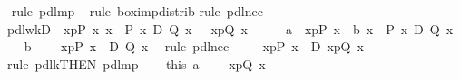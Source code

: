 \begin{isabellebody}
\ \isamarkupfalse%
rule\ pdl{\isacharunderscore}mp{\isacharparenright}\isanewline
\ \isamarkupfalse%
rule\ box{\isacharunderscore}imp{\isacharunderscore}distrib{\isacharparenright}\isanewline
\isamarkupfalse%
rule\ pdl{\isacharunderscore}nec{\isacharparenright}\isanewline
\isanewline
\isanewline
\isamarkupfalse%
\ pdl{\isacharunderscore}wkD{\isacharcolon}\ {\isachardoublequote}{\isasymlbrakk}{\isasymturnstile}\ {\isasymlangle}x{\isasymleftarrow}p{\isasymrangle}{\isacharparenleft}P\ x{\isacharparenright}{\isacharsemicolon}\ {\isasymforall}x{\isachardot}\ {\isasymturnstile}\ P\ x\ {\isasymlongrightarrow}\isactrlsub D\ Q\ x{\isasymrbrakk}\ {\isasymLongrightarrow}\ {\isasymturnstile}\ {\isasymlangle}x{\isasymleftarrow}p{\isasymrangle}{\isacharparenleft}Q\ x{\isacharparenright}{\isachardoublequote}\isanewline
\isamarkupfalse%
\ {\isacharminus}\isanewline
\ \ \isamarkupfalse%
\ a{\isacharcolon}\ {\isachardoublequote}{\isasymturnstile}\ {\isasymlangle}x{\isasymleftarrow}p{\isasymrangle}{\isacharparenleft}P\ x{\isacharparenright}{\isachardoublequote}\ \ b{\isacharcolon}\ {\isachardoublequote}{\isasymforall}x{\isachardot}\ {\isasymturnstile}\ P\ x\ {\isasymlongrightarrow}\isactrlsub D\ Q\ x{\isachardoublequote}\isanewline
\ \ \isamarkupfalse%
\ b\ \isamarkupfalse%
\ {\isachardoublequote}{\isasymturnstile}\ {\isacharbrackleft}{\isacharhash}\ x{\isasymleftarrow}p{\isacharbrackright}{\isacharparenleft}P\ x\ \ {\isasymlongrightarrow}\isactrlsub D\ Q\ x{\isacharparenright}{\isachardoublequote}\ \isamarkupfalse%
\ {\isacharparenleft}rule\ pdl{\isacharunderscore}nec{\isacharparenright}\isanewline
\ \ \isamarkupfalse%
\ {\isachardoublequote}{\isasymturnstile}\ {\isasymlangle}x{\isasymleftarrow}p{\isasymrangle}{\isacharparenleft}P\ x{\isacharparenright}\ \ {\isasymlongrightarrow}\isactrlsub D\ {\isasymlangle}x{\isasymleftarrow}p{\isasymrangle}{\isacharparenleft}Q\ x{\isacharparenright}{\isachardoublequote}\ \isamarkupfalse%
\ {\isacharparenleft}rule\ pdl{\isacharunderscore}k{}{\isacharbrackleft}THEN\ pdl{\isacharunderscore}mp{\isacharbrackright}{\isacharparenright}\isanewline
\ \ \isamarkupfalse%
\ this\ a\ \isamarkupfalse%
\ \ {\isachardoublequote}{\isasymturnstile}\ {\isasymlangle}x{\isasymleftarrow}p{\isasymrangle}{\isacharparenleft}Q\ x{\isacharparenright}{\isachardoublequote}\ \isamarkupfalse%

\end{isabellebody}
